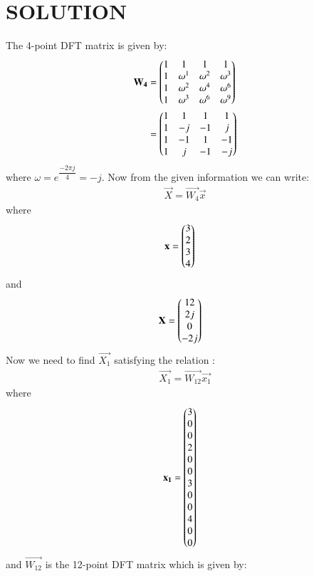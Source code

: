 \documentclass[journal,12pt,twocolumn]{IEEEtran}
\begin{document}
\section{SOLUTION}
\vspace{0.5cm}
The 4-point DFT matrix is given by:
\begin{align}
\mathbf{W_{4}} &=\begin{pmatrix}
 1  & 1 & 1 & 1 \\
 1 & \omega^1  &\omega^2  &\omega^3  \\
 1 & \omega^2  &\omega^4  &\omega^6  \\
 1 & \omega^3  &\omega^6  &\omega^9  \\\end{pmatrix}\\
&=\begin{pmatrix}
1 &  1 &  1 &  1\\
1 &  -j & -1 & j\\
1 & -1 &  1 & -1\\
1 & j & -1 & -j\end{pmatrix}
\end{align}
where $\omega = e^{\dfrac{-2 \pi j}{4}} = -j.$
Now from the given information we can write:
\begin{align}
\vec{X} = \vec{W_{4}}\vec{x} \label{eq:1}
\end{align}
where
\begin{align}
\mathbf{x} &=\begin{pmatrix}3 \\ 2 \\ 3 \\ 4 \end{pmatrix}
\end{align}
and 
\begin{align}
\mathbf{X}&=\begin{pmatrix}12 \\ 2j \\ 0 \\ -2j\end{pmatrix}  
\end{align}
Now we need to find $\vec{X_{1}}$ satisfying the relation :
\begin{align}
\vec{X_{1}} = \vec{W_{12}}\vec{x_{1}} \label{eq:2}  
\end{align}
where
\begin{align}
\mathbf{x_{1}} &=\begin{pmatrix}3 \\ 0 \\ 0 \\ 2 \\ 0 \\ 0 \\ 3 \\ 0 \\ 0 \\ 4 \\ 0 \\ 0\end{pmatrix}
\end{align}
and $\vec{W_{12}}$ is the 12-point DFT matrix which is given by:
\end{document}
